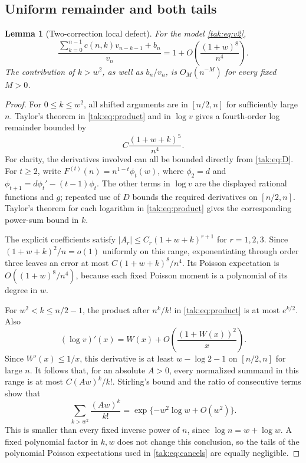 \documentclass[11pt,letterpaper]{article}
\newtheorem{lemma}[theorem]{Lemma}
\theoremstyle{remark}\newtheorem{remark}[theorem]{Remark}
\begin{document}
\subsection{Uniform remainder and both tails}
\begin{lemma}[Two-correction local defect]\label{tak:lem:local}
For the model \eqref{tak:eq:v2},
\begin{equation}
 \frac{\sum_{k=0}^{n-1}c(n,k)v_{n-k-1}+b_n}{v_n}
       =1+O\!\left(\frac{(1+w)^8}{n^4}\right).\label{tak:eq:localres}
\end{equation}
The contribution of $k>w^2$, as well as $b_n/v_n$, is $O_M(n^{-M})$ for every fixed $M>0$.
\end{lemma}
\begin{proof}
For $0\leq k\leq w^2$, all shifted arguments are in $[n/2,n]$ for sufficiently large $n$. Taylor's theorem in \eqref{tak:eq:product} and in $\log v$ gives a fourth-order log remainder bounded by
\[
 C\frac{(1+w+k)^5}{n^4}.
\]
For clarity, the derivatives involved can all be bounded directly from \eqref{tak:eq:D}. For $t\geq2$, write $F^{(t)}(n)=n^{1-t}\phi_t(w)$, where
$\phi_2=d$ and $\phi_{t+1}=d\phi_t'-(t-1)\phi_t$.
The other terms in $\log v$ are the displayed rational functions and $g$; repeated use of $D$ bounds the required derivatives on $[n/2,n]$. Taylor's theorem for each logarithm in \eqref{tak:eq:product} gives the corresponding power-sum bound in $k$.

The explicit coefficients satisfy $|A_r|\leq C_r(1+w+k)^{r+1}$ for $r=1,2,3$. Since $(1+w+k)^2/n=o(1)$ uniformly on this range, exponentiating through order three leaves an error at most
$C(1+w+k)^8/n^4$. Its Poisson expectation is $O((1+w)^8/n^4)$, because each fixed Poisson moment is a polynomial of its degree in $w$.

For $w^2<k\leq n/2-1$, the product after $n^k/k!$ in \eqref{tak:eq:product} is at most $e^{k/2}$. Also
\[
 (\log v)'(x)=W(x)+O\!\left(\frac{(1+W(x))^2}{x}\right).
\]
Since $W'(x)\leq1/x$, this derivative is at least $w-\log2-1$ on $[n/2,n]$ for large $n$. It follows that, for an absolute $A>0$, every normalized summand in this range is at most $C(Aw)^k/k!$. Stirling's bound and the ratio of consecutive terms show that
\[
 \sum_{k>w^2}\frac{(Aw)^k}{k!}
       =\exp\{-w^2\log w+O(w^2)\}.
\]
This is smaller than every fixed inverse power of $n$, since $\log n=w+\log w$. A fixed polynomial factor in $k,w$ does not change this conclusion, so the tails of the polynomial Poisson expectations used in \eqref{tak:eq:cancels} are equally negligible.


\end{proof}
\end{document}
